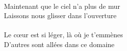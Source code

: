 \\
Maintenant que le ciel n'a plus de mur \\
Laissons nous glisser dans l'ouverture \\
\\
Le cœur est si léger, là où je t'emmènes \\
D'autres sont allées dans ce domaine \\
